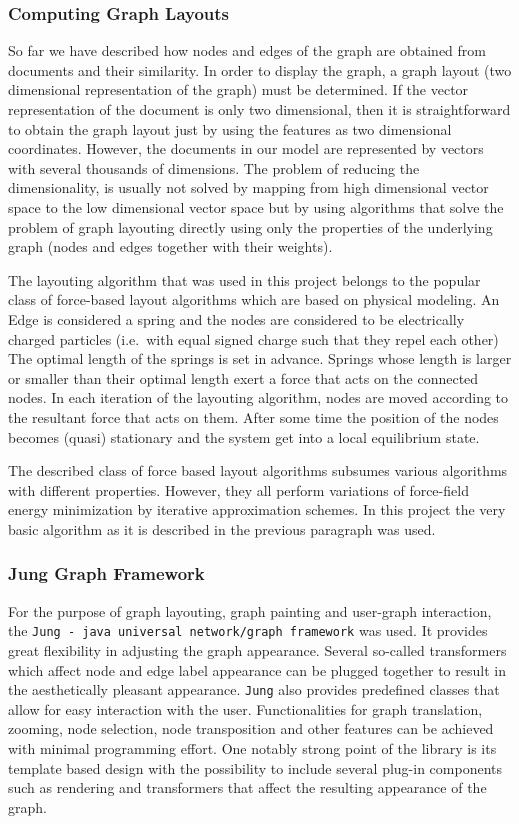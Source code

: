 \subsubsection{Computing Graph Layouts}
So far we have described how nodes and edges of the graph are obtained from documents and their
similarity. In order to display the graph, a graph layout (two dimensional representation of the
graph) must be determined. If the vector representation of the document is only two dimensional,
then it is straightforward to obtain the graph layout just by using the features as two dimensional
coordinates. However, the documents in our model are represented by vectors with several thousands
of dimensions. The problem of reducing the dimensionality, is usually not solved by mapping
from high dimensional vector space to the low dimensional vector space but by using algorithms that
solve the problem of graph layouting directly using only the properties of the underlying graph
(nodes and edges together with their weights).

The layouting algorithm that was used in this project belongs to the popular class of force-based
layout algorithms which are based on physical modeling. An Edge is considered a spring and
the nodes are considered to be electrically charged particles (i.e.\ with equal signed charge such
that they repel each other) The optimal length of the springs is set in advance. Springs whose
length is larger or smaller than their optimal length exert a force that acts on the connected
nodes. In each iteration of the layouting algorithm, nodes are moved according to the resultant
force
that acts on them. After some time the position of the nodes becomes (quasi) stationary and the
system get into a local equilibrium state.

The described class of force based layout algorithms subsumes various algorithms with different
properties. However, they all perform variations of force-field energy minimization by iterative
approximation schemes. In this project the very basic algorithm as it is described in the previous
paragraph was used.

\subsubsection{Jung Graph Framework}
For the purpose of graph layouting, graph painting and user-graph interaction, the
\texttt{Jung - java universal network/graph framework}
was used. It provides great flexibility in adjusting the graph appearance. Several so-called
transformers which affect node and edge label appearance can be plugged together to result in the
aesthetically pleasant appearance. \texttt{Jung} also provides predefined classes that allow for
easy interaction with the user. Functionalities for graph translation, zooming, node selection, node
transposition and other features can be achieved with minimal programming effort. One notably
strong point of the library is its template based design with the possibility to include several
plug-in components such as rendering and transformers that affect the resulting appearance of the
graph.

